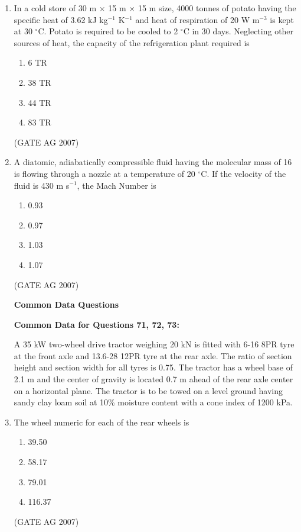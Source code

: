 \documentclass[journal,12pt,onecolumn]{IEEEtran}
\theoremstyle{remark}
\begin{document}
\begin{enumerate}[label=Q\arabic*:]
\item In a cold store of 30 m $\times$ 15 m $\times$ 15 m size, 4000 tonnes of potato having the specific heat of 3.62 kJ kg$^{-1}$ K$^{-1}$ and heat of respiration of 20 W m$^{-3}$ is kept at 30 $^{\circ}$C. Potato is required to be cooled to 2 $^{\circ}$C in 30 days. Neglecting other sources of heat, the capacity of the refrigeration plant required is
\begin{multicols}{4}
\begin{enumerate}
    \item 6 TR
    \item 38 TR
    \item 44 TR
    \item 83 TR
\end{enumerate}
\end{multicols}
\hfill(GATE AG 2007)

\item A diatomic, adiabatically compressible fluid having the molecular mass of 16 is flowing through a nozzle at a temperature of 20 $^{\circ}$C. If the velocity of the fluid is 430 m s$^{-1}$, the Mach Number is
\begin{multicols}{4}
\begin{enumerate}
    \item 0.93
    \item 0.97
    \item 1.03
    \item 1.07
\end{enumerate}
\end{multicols}
\hfill(GATE AG 2007)

\begin{center}
\textbf{Common Data Questions}
\end{center}
\textbf{Common Data for Questions 71, 72, 73:}

A 35 kW two-wheel drive tractor weighing 20 kN is fitted with 6-16 8PR tyre at the front axle and 13.6-28 12PR tyre at the rear axle. The ratio of section height and section width for all tyres is 0.75. The tractor has a wheel base of 2.1 m and the center of gravity is located 0.7 m ahead of the rear axle center on a horizontal plane. The tractor is to be towed on a level ground having sandy clay loam soil at 10\% moisture content with a cone index of 1200 kPa.

\item The wheel numeric for each of the rear wheels is
\begin{multicols}{4}
\begin{enumerate}
    \item 39.50
    \item 58.17
    \item 79.01
    \item 116.37
\end{enumerate}
\end{multicols}
\hfill(GATE AG 2007)


\end{enumerate}
\end{document}
